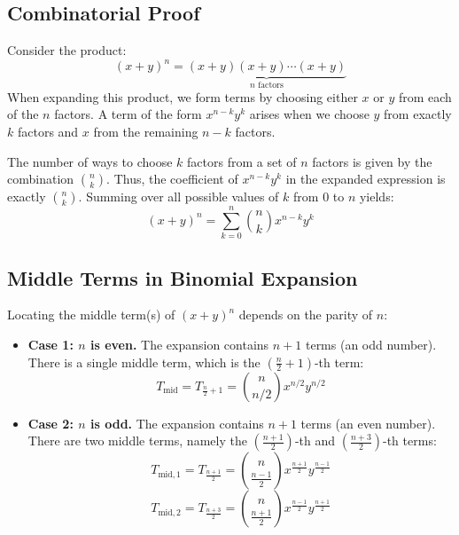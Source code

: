 \documentclass[10pt,journal,compsoc,onecolumn]{IEEEtran}
\begin{document}
\subsection{Combinatorial Proof}

Consider the product:
\begin{equation}
(x + y)^n = \underbrace{(x + y)(x + y) \cdots (x + y)}_{n \text{ factors}}
\end{equation}
When expanding this product, we form terms by choosing either $x$ or $y$ from each of the $n$ factors. A term of the form $x^{n-k}y^k$ arises when we choose $y$ from exactly $k$ factors and $x$ from the remaining $n-k$ factors. 

The number of ways to choose $k$ factors from a set of $n$ factors is given by the combination $\binom{n}{k}$. Thus, the coefficient of $x^{n-k}y^k$ in the expanded expression is exactly $\binom{n}{k}$. Summing over all possible values of $k$ from $0$ to $n$ yields:
\begin{equation}
(x + y)^n = \sum_{k=0}^{n} \binom{n}{k} x^{n - k} y^k
\end{equation}

\subsection{Middle Terms in Binomial Expansion}

Locating the middle term(s) of $(x+y)^n$ depends on the parity of $n$:
\begin{itemize}
    \item \textbf{Case 1: $n$ is even.} The expansion contains $n+1$ terms (an odd number). There is a single middle term, which is the $(\frac{n}{2} + 1)$-th term:
    \begin{equation}
    T_{\text{mid}} = T_{\frac{n}{2} + 1} = \binom{n}{n/2} x^{n/2} y^{n/2}
    \end{equation}
    \item \textbf{Case 2: $n$ is odd.} The expansion contains $n+1$ terms (an even number). There are two middle terms, namely the $(\frac{n+1}{2})$-th and $(\frac{n+3}{2})$-th terms:
    \begin{equation}
    T_{\text{mid}, 1} = T_{\frac{n+1}{2}} = \binom{n}{\frac{n-1}{2}} x^{\frac{n+1}{2}} y^{\frac{n-1}{2}}
    \end{equation}
    \begin{equation}
    T_{\text{mid}, 2} = T_{\frac{n+3}{2}} = \binom{n}{\frac{n+1}{2}} x^{\frac{n-1}{2}} y^{\frac{n+1}{2}}
    \end{equation}
\end{itemize}
\end{document}
